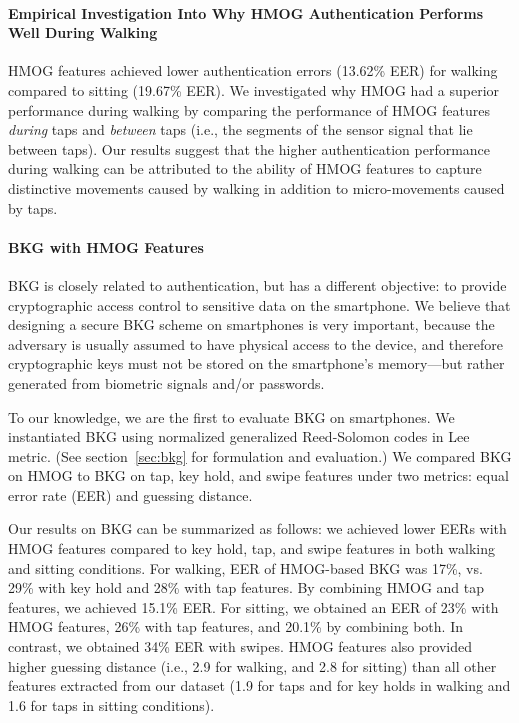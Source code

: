 \paragraph{Empirical Investigation Into Why HMOG Authentication Performs Well During Walking}  HMOG features achieved lower authentication errors (13.62\% EER) for walking compared to sitting (19.67\% EER). We investigated why HMOG had a superior performance during walking by comparing the performance of HMOG features {\em during} taps and {\em between} taps (i.e., the segments of the sensor signal that lie between taps). Our results suggest that the higher authentication performance %
during walking can be attributed to the ability of HMOG features to capture distinctive 
%
movements caused by walking in addition to micro-movements caused by taps. %




\paragraph{BKG with HMOG Features} 
%
BKG is closely related to authentication, but has a different objective: to 
provide cryptographic access control to sensitive data on the smartphone. We 
believe that designing a secure BKG scheme on smartphones is very important, 
because the adversary is usually assumed to have physical access to the device, 
and therefore cryptographic keys must not be stored on the smartphone's memory---but rather generated from biometric signals and/or passwords.

To our knowledge, we are the first to evaluate BKG on smartphones. We instantiated BKG using normalized generalized Reed-Solomon codes in Lee metric. (See section~\ref{sec:bkg} for formulation and evaluation.) We compared BKG on HMOG to BKG on tap, key hold, and swipe features under two metrics: equal error rate (EER) and guessing distance. 

Our results on BKG can be summarized as follows: we achieved lower EERs with HMOG features compared to key hold, tap, and swipe features in both walking and sitting conditions. For walking, EER of HMOG-based BKG was 17\%, vs. 29\% with key hold and 28\% with tap features. By combining HMOG and tap features, we achieved 15.1\% EER. For sitting, we obtained an EER of 23\% with HMOG features, 26\% with tap features, and 20.1\% by combining both. In contrast, we obtained 34\% EER with swipes. HMOG features also provided higher guessing distance (i.e., 2.9 for walking, and 2.8 for sitting) than all other features extracted from our dataset (1.9 for taps and for key holds in walking and 1.6 for taps in sitting conditions). 


